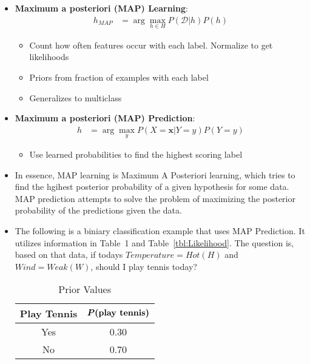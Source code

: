\documentclass{article}
\renewcommand{\dim}{\mathcal{D}}
\begin{document}
\begin{enumerate}
\begin{itemize}
\item {\bf Maximum a posteriori (MAP) Learning}:
\begin{align}
h_{MAP} &= \arg\max_{h\in H}P(\dim|h)P(h)
\end{align}
\begin{itemize}
\item Count how often features occur with each label. Normalize to get likelihoods
\item Priors from fraction of examples with each label
\item Generalizes to multiclass
\end{itemize}
\item {\bf Maximum a posteriori (MAP) Prediction}:
\begin{align}
h &= \arg\max_{y}P(X=\mathbf{x}|Y=y)P(Y=y)
\end{align}
\begin{itemize}
\item Use learned probabilities to find the highest scoring label
\end{itemize}
\item In essence, MAP learning is Maximum A Posteriori learning, which tries to find the hgihest posterior probability of a given hypothesis for some data. MAP prediction attempts to solve the problem of maximizing the posterior probability of the predictions given the data.
\item The following is a biniary classification example that uses MAP Prediction. It utilizes information in Table~1 and Table~\ref{tbl:Likelihood}. The question is, based on that data, if todays $Temperature=Hot(H)$ and $Wind=Weak(W)$, should I play tennis today?

\begin{table}[H]
\centering
\caption{Prior Values}
\begin{tabular}{c c}
\hline\hline
{\bf Play Tennis} & $\boldsymbol{P(\text{\bf play tennis})}$\\
\hline
Yes & 0.30\\
No & 0.70\\
\hline
\end{tabular}
\label{tbl:Prior}
\end{table}


\end{itemize}
\end{enumerate}
\end{document}
